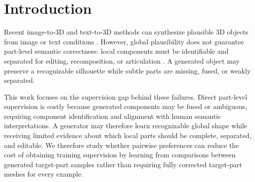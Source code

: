 \documentclass[10pt,twocolumn,letterpaper]{article}
\begin{document}
\section{Introduction}
Recent image-to-3D and text-to-3D methods can synthesize plausible 3D objects from image or text conditions \cite{poole2022dreamfusion,liu2023zero1to3,hong2023lrm}. However, global plausibility does not guarantee part-level semantic correctness: local components must be identifiable and separated for editing, recomposition, or articulation \cite{mo2019partnet,wang2019shape2motion,li2026partrag,liu2024singapo,liu2026pact}. A generated object may preserve a recognizable silhouette while subtle parts are missing, fused, or weakly separated.

This work focuses on the supervision gap behind these failures. Direct part-level supervision is costly because generated components may be fused or ambiguous, requiring component identification and alignment with human semantic interpretations. A generator may therefore learn recognizable global shape while receiving limited evidence about which local parts should be complete, separated, and editable.
We therefore study whether pairwise preferences can reduce the cost of obtaining training supervision by learning from comparisons between generated target-part samples rather than requiring fully corrected target-part meshes for every example.
\end{document}
